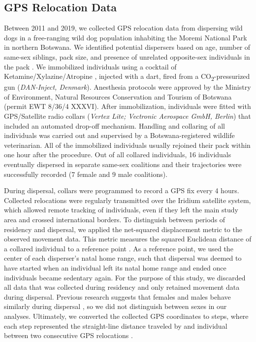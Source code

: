 \documentclass[abstract=on,10pt,a4paper,bibliography=totocnumbered]{article}
\begin{document}
\subsection{GPS Relocation Data}
Between 2011 and 2019, we collected GPS relocation data from dispersing wild
dogs in a free-ranging wild dog population inhabiting the Moremi National Park
in northern Botswana. We identified potential dispersers based on age, number of
same‐sex siblings, pack size, and presence of unrelated opposite-sex individuals
in the pack \citep{McNutt.1996, Behr.2020}. We immobilized individuals using a
cocktail of Ketamine/Xylazine/Atropine \citep{Osofsky.1996, Cozzi.2020},
injected with a dart, fired from a CO\textsubscript{2}-pressurized gun
(\textit{DAN-Inject, Denmark}). Anesthesia protocols were approved by the
Ministry of Environment, Natural Resources Conservation and Tourism of Botswana
(permit EWT 8/36/4 XXXVI). After immobilization, individuals were fitted with
GPS/Satellite radio collars (\textit{Vertex Lite; Vectronic Aerospace GmbH,
Berlin}) that included an automated drop-off mechanism. Handling and collaring
of all individuals was carried out and supervised by a Botswana-registered
wildlife veterinarian. All of the immobilized individuals usually rejoined their
pack within one hour after the procedure. Out of all collared individuals, 16
individuals eventually dispersed in separate same-sex coalitions and their
trajectories were successfully recorded (7 female and 9 male coalitions).

During dispersal, collars were programmed to record a GPS fix every 4 hours.
Collected relocations were regularly transmitted over the Iridium satellite
system, which allowed remote tracking of individuals, even if they left the main
study area and crossed international borders. To distinguish between periods of
residency and dispersal, we applied the net-squared displacement metric to the
observed movement data. This metric measures the squared Euclidean distance of a
collared individual to a reference point \citep{Borger.2012}. As a reference
point, we used the center of each disperser's natal home range, such that
dispersal was deemed to have started when an individual left its natal home
range and ended once individuals became sedentary again. For the purpose of this
study, we discarded all data that was collected during residency and only
retained movement data during dispersal. Previous research suggests that females
and males behave similarly during dispersal \citep{Woodroffe.2019, Cozzi.2020},
so we did not distinguish between sexes in our analyses. Ultimately, we
converted the collected GPS coordinates to steps, where each step represented
the straight-line distance traveled by and individual between two consecutive
GPS relocations \citep{Turchin.1998}.
\end{document}
